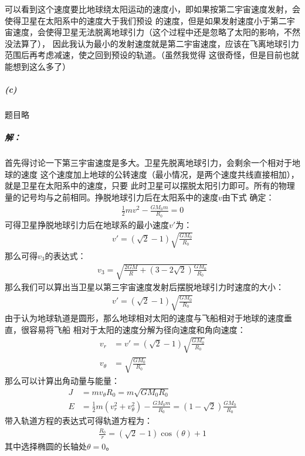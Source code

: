 \documentclass[a4paper]{ctexart}
\begin{document}
    可以看到这个速度要比地球绕太阳运动的速度小，即如果按第二宇宙速度发射，会使得卫星在太阳系中的速度大于我们预设
    的速度，但是如果发射速度小于第二宇宙速度，会使得卫星无法脱离地球引力（这个过程中还是忽略了太阳的影响，不然没法算了），
    因此我认为最小的发射速度就是第二宇宙速度，应该在飞离地球引力范围后再考虑减速，使之回到预设的轨道。（虽然我觉得
    这很奇怪，但是目前也就能想到这么多了）
    \subparagraph{(c)}
    题目略
    \subparagraph{解：}首先得讨论一下第三宇宙速度是多大。卫星先脱离地球引力，会剩余一个相对于地球的速度
    这个速度加上地球的公转速度（最小情况，是两个速度共线直接相加），就是卫星在太阳系中的速度，只要
    此时卫星可以摆脱太阳引力即可。所有的物理量的记号均与之前相同。挣脱地球引力后在太阳系中的速度$v$由下式
    确定：
    \begin{align}
        \frac{1}{2}mv^{2} - \frac{GM_{0}m}{R_{0}} = 0
    \end{align}
    可得卫星挣脱地球引力后在地球系的最小速度$v'$为：
    \begin{align}
        v' = (\sqrt{2} - 1)\sqrt{\frac{GM_{0}}{R_{0}}}
    \end{align}
    那么可得$v_{3}$的表达式：
    \begin{align}
        v_{3} = \sqrt{\frac{2GM}{R} + (3-2\sqrt{2})\frac{GM_{0}}{R_{0}}}
    \end{align}
    那么我们可以算出当卫星以第三宇宙速度发射后摆脱地球引力时速度的大小：
    \begin{align}
        v' = (\sqrt{2} - 1)\sqrt{\frac{GM_{0}}{R_{0}}}
    \end{align}
    由于认为地球轨道是圆形，那么地球相对太阳的速度与飞船相对于地球的速度垂直，很容易将飞船
    相对于太阳的速度分解为径向速度和角向速度：
    \begin{align}
        v_{r} &= v' = (\sqrt{2} - 1)\sqrt{\frac{GM_{0}}{R_{0}}}\\
        v_{\theta} &= \sqrt{\frac{GM_{0}}{R_{0}}}
    \end{align}
    那么可以计算出角动量与能量：
    \begin{align}
        J &= mv_{\theta}R_{0} = m\sqrt{GM_{0}R_{0}}\\
        E &= \frac{1}{2}m(v_{r}^{2} + v_{\theta}^{2}) - \frac{GM_{0}m}{R_{0}}=(1 - \sqrt{2})\frac{GM_{0}}{R_{0}} 
    \end{align}
    带入轨道方程的表达式可得轨道方程为：
    \begin{align}
        \frac{R_{0}}{r} = (\sqrt{2} - 1)\cos(\theta) + 1
    \end{align}
    其中选择椭圆的长轴处$\theta = 0$。
    \\
\end{document}
